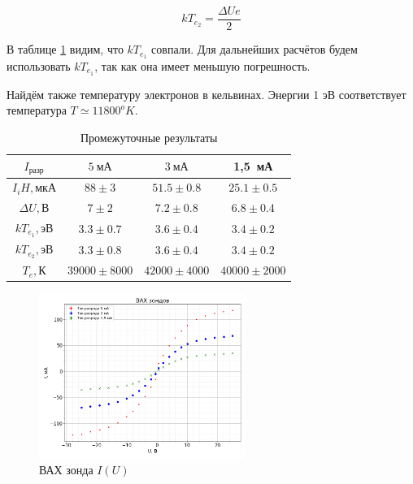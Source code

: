 \documentclass[a4paper, 12pt]{article}
\begin{document}
            $$
                kT_{e_2} = \frac{\Delta U e}{2}
            $$

            В таблице \ref{tab:res1} видим, что $kT_{e_1}$ совпали. Для дальнейших расчётов будем использовать $kT_{e_1}$, так как она имеет меньшую погрешность.

            Найдём также температуру электронов в кельвинах. Энергии 1 эВ соответствует температура $T \simeq 11800^oK$.

            \begin{table}[!ht]
                \centering
                \begin{tabular}{|c|c|c|c|}
                    \hline

                    $I_{разр}$ & $5~мА$ & $3~мА$ & 1,5~мА\\ \hline
                    $I_iH, мкА$ & $88 \pm 3$ & $51.5 \pm 0.8$ & $25.1 \pm 0.5$\\ \hline
                    $\Delta U, В$ & $7 \pm 2$ & $7.2 \pm 0.8$ & $6.8 \pm 0.4$\\ \hline
                    $kT_{e_1}, эВ$ & $3.3 \pm 0.7$ & $3.6 \pm 0.4$ & $3.4 \pm 0.2$\\ \hline
                    $kT_{e_2}, эВ$ & $3.3 \pm 0.8$ & $3.6 \pm 0.4$ & $3.4 \pm 0.2$\\ \hline
                    $T_e, К$ & $39000 \pm 8000$ & $42000 \pm 4000$ & $40000 \pm 2000$\\ \hline

                \end{tabular}
                \caption{Промежуточные результаты}
                \label{tab:res1}
            \end{table}

            \begin{figure}[!ht]
                \centering
                \includegraphics[width=0.6\textwidth]{img/vah_zond.png}
                \caption{ВАХ зонда $I(U)$}
                \label{plot:vah_zond}
            \end{figure}
\end{document}
